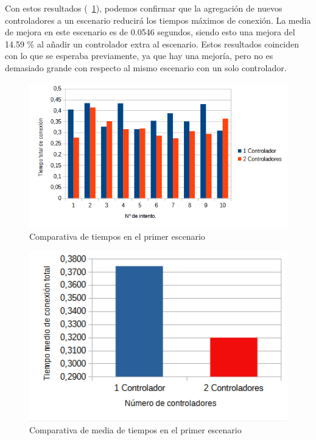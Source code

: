 \documentclass[a4paper, 12pt]{book}
\begin{document}
 	Con estos resultados (~\ref{figura:comparativabucle4}), podemos confirmar que la agregación de nuevos controladores a un escenario reducirá los tiempos máximos de conexión. La media de mejora en este escenario es de 0.0546 segundos, siendo esto una mejora del 14.59 \% al añadir un controlador extra al escenario. 
 	Estos resultados coinciden con lo que se esperaba previamente, ya que hay una mejoría, pero no es demasiado grande con respecto al mismo escenario con un solo controlador.
 	
 	\begin{figure}[H]
 		\centering
 		\includegraphics[width=16cm, keepaspectratio]{img/comparativabucle4}
 		\caption{Comparativa de tiempos en el primer escenario}
 		\label{figura:comparativabucle4}
 	\end{figure}
 	
 	\begin{figure}[H]
 		\centering
 		\includegraphics[width=12cm, keepaspectratio]{img/comparativamediasbucle}
 		\caption{Comparativa de media de tiempos en el primer escenario}
 		\label{figura:mediabucle4}
 	\end{figure}
 	
\end{document}
